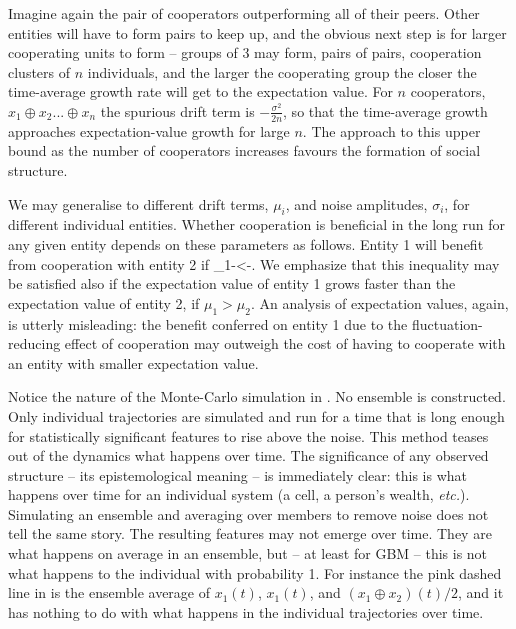 Imagine again the pair of cooperators outperforming all of their peers. Other
entities will have to form pairs to keep up, and the obvious next step is for larger
cooperating units to form -- groups of 3 may form, pairs of pairs, cooperation 
clusters of $n$ individuals, and the larger the cooperating group the closer the
time-average growth rate will get to the expectation value.
For $n$ cooperators, $x_1\oplus x_2 ... \oplus x_n$ the spurious drift term is 
$-\frac{\sigma^2}{2n}$, so that the time-average growth approaches 
expectation-value growth for large $n$. The approach to this upper bound as 
the number of cooperators increases favours the formation of social structure. 

We may generalise to different drift 
terms, $\mu_i$, and noise amplitudes, $\sigma_i$, for different individual entities. 
Whether cooperation is beneficial in the long run for any
given entity depends on these parameters as follows. Entity 1 
will benefit from cooperation with entity 2 if 
\be
\mu_1-<-.
\ee
We emphasize that this inequality may be satisfied also if the expectation value
of entity 1 grows faster than the expectation value of entity 2, \ie if
$\mu_1>\mu_2$. An analysis of expectation values, again, is utterly misleading:
the benefit conferred on entity 1 due to the fluctuation-reducing effect of 
cooperation may outweigh the cost of having to cooperate with an entity with
smaller expectation value.
 
Notice the nature of the Monte-Carlo simulation in . No ensemble
is constructed. Only individual trajectories are simulated and run for a time that is 
long enough for statistically significant features to rise above the noise. This method
teases out of the dynamics what happens over time. The significance of any observed 
structure -- its epistemological meaning -- is immediately clear: this is what happens over time
for an individual system (a cell, a person's wealth, {\it etc.}). Simulating an ensemble
and averaging over members to remove noise does not tell the same story. The resulting
features may not emerge over time. They are what happens on average in an ensemble, 
but -- at least for GBM -- this is not what happens to the individual with probability 1. For instance the 
 pink dashed line in  is the ensemble average of $x_1(t)$, $x_1(t)$, 
 and $(x_1 \oplus x_2)(t)/2$, and it has nothing to do with what happens 
 in the individual trajectories over time.

